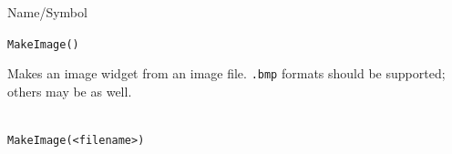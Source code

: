\begin{desc}{Name/Symbol}
\item[Name/Symbol]	\verb+MakeImage()+

\item[Description]	Makes an image widget from an image file.
		\texttt{.bmp} formats should be supported; others may be as well.

\item[Usage]		
\begin{verbatim}

MakeImage(<filename>)
\end{verbatim}

\item[Example]	

\item[See Also]	
\end{desc}



